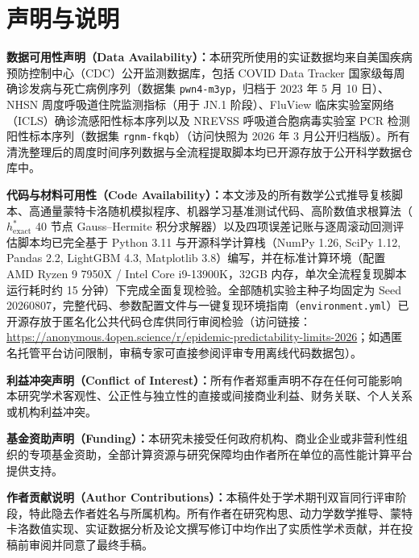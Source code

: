 \documentclass[11pt,a4paper]{article}
\theoremstyle{plain}
\theoremstyle{definition}
\begin{document}
\clearpage
{}
\section*{声明与说明}

\noindent\textbf{数据可用性声明（Data Availability）：}本研究所使用的实证数据均来自美国疾病预防控制中心（CDC）公开监测数据库，包括 COVID Data Tracker 国家级每周确诊发病与死亡病例序列（数据集 \texttt{pwn4-m3yp}，归档于 2023 年 5 月 10 日）、NHSN 周度呼吸道住院监测指标（用于 JN.1 阶段）、FluView 临床实验室网络（ICLS）确诊流感阳性标本序列以及 NREVSS 呼吸道合胞病毒实验室 PCR 检测阳性标本序列（数据集 \texttt{rgnm-fkqb}）（访问快照为 2026 年 3 月公开归档版）。所有清洗整理后的周度时间序列数据与全流程提取脚本均已开源存放于公开科学数据仓库中。

\vspace{0.4em}
\noindent\textbf{代码与材料可用性（Code Availability）：}本文涉及的所有数学公式推导复核脚本、高通量蒙特卡洛随机模拟程序、机器学习基准测试代码、高阶数值求根算法（$h^*_{\text{exact}}$ 40 节点 Gauss--Hermite 积分求解器）以及四项误差记账与逐周滚动回测评估脚本均已完全基于 Python 3.11 与开源科学计算栈（NumPy 1.26, SciPy 1.12, Pandas 2.2, LightGBM 4.3, Matplotlib 3.8）编写，并在标准计算环境（配置 AMD Ryzen 9 7950X / Intel Core i9-13900K，32GB 内存，单次全流程复现脚本运行耗时约 15 分钟）下完成全面复现检验。全部随机实验主种子均固定为 Seed 20260807，完整代码、参数配置文件与一键复现环境指南（\texttt{environment.yml}）已开源存放于匿名化公共代码仓库供同行审阅检验（访问链接：\url{https://anonymous.4open.science/r/epidemic-predictability-limits-2026}；如遇匿名托管平台访问限制，审稿专家可直接参阅评审专用离线代码数据包）。

\vspace{0.4em}
\noindent\textbf{利益冲突声明（Conflict of Interest）：}所有作者郑重声明不存在任何可能影响本研究学术客观性、公正性与独立性的直接或间接商业利益、财务关联、个人关系或机构利益冲突。

\vspace{0.4em}
\noindent\textbf{基金资助声明（Funding）：}本研究未接受任何政府机构、商业企业或非营利性组织的专项基金资助，全部计算资源与研究保障均由作者所在单位的高性能计算平台提供支持。

\vspace{0.4em}
\noindent\textbf{作者贡献说明（Author Contributions）：}本稿件处于学术期刊双盲同行评审阶段，特此隐去作者姓名与所属机构。所有作者在研究构思、动力学数学推导、蒙特卡洛数值实现、实证数据分析及论文撰写修订中均作出了实质性学术贡献，并在投稿前审阅并同意了最终手稿。
\end{document}
